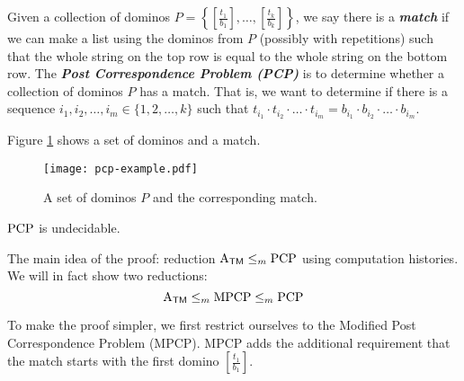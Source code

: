 Given a collection of dominos $\displaystyle P = \left\{ \left[ \frac{t_1}{b_1} \right], \ldots, \left[ \frac{t_k}{b_k} \right] \right\}$, we say there is a \textit{\textbf{match}} if we can make a list using the dominos from $P$ (possibly with repetitions) such that the whole string on the top row is equal to the whole string on the bottom row. The \textit{\textbf{Post Correspondence Problem (PCP)}} is to determine whether a collection of dominos $P$ has a match. That is, we want to determine if there is a sequence $i_1,i_2,\ldots,i_m \in \{1,2,\ldots,k\}$ such that $t_{i_1} \cdot t_{i_2} \cdot \ldots \cdot t_{i_m} = b_{i_1} \cdot b_{i_2} \cdot \ldots \cdot b_{i_m}$.

Figure \ref{fig:pcp-example} shows a set of dominos and a match.

\begin{figure}[htbp]
    \centering
    \texttt{[image: pcp-example.pdf]}
    \caption{A set of dominos $P$ and the corresponding match.}
    \label{fig:pcp-example}
\end{figure}

\begin{theorem}
    $\mathrm{PCP}$ is undecidable.
\end{theorem}

The main idea of the proof: reduction $\mathrm{A}_{\mathsf{TM}} \leq_m \mathrm{PCP}$ using computation histories. We will in fact show two reductions:
$$
\mathrm{A}_{\mathsf{TM}} \leq_m \mathrm{MPCP} \leq_m \mathrm{PCP}
$$

To make the proof simpler, we first restrict ourselves to the Modified Post Correspondence Problem (MPCP). MPCP adds the additional requirement that the match starts with the first domino $\left[ \frac{t_1}{b_1} \right]$.

